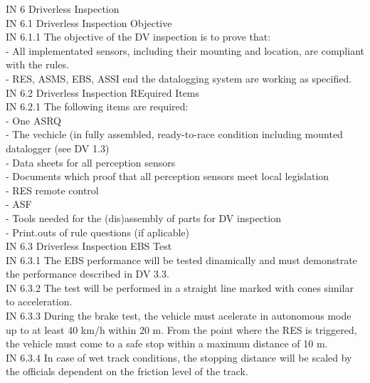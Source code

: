 \documentclass{article}
\begin{document}
IN 6 Driverless Inspection\\

IN 6.1 Driverless Inspection Objective\\

IN 6.1.1 The objective of the DV inspection is to prove that:\\
	- All implementated sensors, including their mounting and location, are compliant with the rules.\\
	- RES, ASMS, EBS, ASSI end the datalogging system are working as specified.\\
	
IN 6.2 Driverless Inspection REquired Items\\

IN 6.2.1 The following items are required:\\
	- One ASRQ\\
	- The vechicle (in fully assembled, ready-to-race condition including mounted datalogger (see DV 1.3)\\
	- Data sheets for all perception sensors\\
	- Documents which proof that all perception sensors meet local legislation\\
	- RES remote control\\
	- ASF\\
	- Tools needed for the (dis)assembly of parts for DV inspection\\
	- Print.outs of rule questions (if aplicable)\\

IN 6.3 Driverless Inspection EBS Test\\

IN 6.3.1 The EBS performance will be tested dinamically and must demonstrate the performance described in DV 3.3.\\

IN 6.3.2 The test will be performed in a straight line marked with cones similar to acceleration.\\

IN 6.3.3 During the brake test, the vehicle must acelerate in autonomous mode up to at least 40 km/h within 20 m. From the point where the RES is triggered, the vehicle must come to a safe stop within a maximum distance of 10 m.\\

IN 6.3.4 In case of wet track conditions, the stopping distance will be scaled by the officials dependent on the friction level of the track.\\
\end{document}
